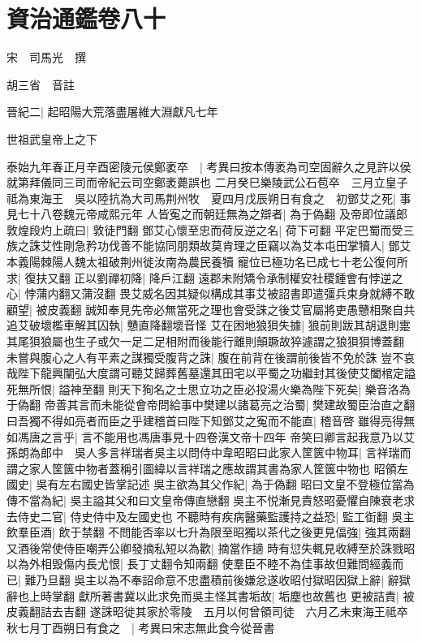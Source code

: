 \chapter{資治通鑑卷八十}
宋　司馬光　撰

胡三省　音註

晉紀二|{
	起昭陽大荒落盡屠維大淵獻凡七年}


世祖武皇帝上之下

泰始九年春正月辛酉密陵元侯鄭袤卒　|{
	考異曰按本傳袤為司空固辭久之見許以侯就第拜儀同三司而帝紀云司空鄭袤薨誤也}
二月癸巳樂陵武公石苞卒　三月立皇子祗為東海王　吳以陸抗為大司馬荆州牧　夏四月戊辰朔日有食之　初鄧艾之死|{
	事見七十八卷魏元帝咸熙元年}
人皆寃之而朝廷無為之辯者|{
	為于偽翻}
及帝即位議郎敦煌段灼上疏曰|{
	敦徒門翻}
鄧艾心懷至忠而荷反逆之名|{
	荷下可翻}
平定巴蜀而受三族之誅艾性剛急矜功伐善不能協同朋類故莫肯理之臣竊以為艾本屯田掌犢人|{
	鄧艾本義陽棘陽人魏太祖破荆州徙汝南為農民養犢}
寵位已極功名已成七十老公復何所求|{
	復扶又翻}
正以劉禪初降|{
	降戶江翻}
遠郡未附矯令承制權安社稷鍾會有悖逆之心|{
	悖蒲内翻又蒲沒翻}
畏艾威名因其疑似構成其事艾被詔書即遣彊兵束身就縛不敢顧望|{
	被皮義翻}
誠知奉見先帝必無當死之理也會受誅之後艾官屬將吏愚戇相聚自共追艾破壞檻車解其囚執|{
	戇直降翻壞音怪}
艾在困地狼狽失據|{
	狼前則跋其胡退則疐其尾狽狼屬也生子或欠一足二足相附而後能行離則顛蹶故猝遽謂之狼狽狽博蓋翻}
未嘗與腹心之人有平素之謀獨受腹背之誅|{
	腹在前背在後謂前後皆不免於誅}
豈不哀哉陛下龍興闡弘大度謂可聽艾歸葬舊墓還其田宅以平蜀之功繼封其後使艾闔棺定謚死無所恨|{
	謚神至翻}
則天下狥名之士思立功之臣必投湯火樂為陛下死矣|{
	樂音洛為于偽翻}
帝善其言而未能從會帝問給事中樊建以諸葛亮之治蜀|{
	樊建故蜀臣治直之翻}
曰吾獨不得如亮者而臣之乎建稽首曰陛下知鄧艾之寃而不能直|{
	稽音啓}
雖得亮得無如馮唐之言乎|{
	言不能用也馮唐事見十四卷漢文帝十四年}
帝笑曰卿言起我意乃以艾孫朗為郎中　吳人多言祥瑞者吳主以問侍中韋昭昭曰此家人筐篋中物耳|{
	言祥瑞而謂之家人筐篋中物者蓋稱引圖緯以言祥瑞之應故謂其書為家人筐篋中物也}
昭領左國史|{
	吳有左右國史皆掌記述}
吳主欲為其父作紀|{
	為于偽翻}
昭曰文皇不登極位當為傳不當為紀|{
	吳主謚其父和曰文皇帝傳直戀翻}
吳主不悦漸見責怒昭憂懼自陳衰老求去侍史二官|{
	侍史侍中及左國史也}
不聽時有疾病醫藥監護持之益恐|{
	監工衘翻}
吳主飲羣臣酒|{
	飲于禁翻}
不問能否率以七升為限至昭獨以茶代之後更見偪強|{
	強其兩翻}
又酒後常使侍臣嘲弄公卿發摘私短以為歡|{
	摘當作擿}
時有愆失輒見收縛至於誅戮昭以為外相毁傷内長尤恨|{
	長丁丈翻令知兩翻}
使羣臣不睦不為佳事故但難問經義而已|{
	難乃旦翻}
吳主以為不奉詔命意不忠盡積前後嫌忿遂收昭付獄昭因獄上辭|{
	辭獄辭也上時掌翻}
獻所著書冀以此求免而吳主怪其書垢故|{
	垢塵也故舊也}
更被詰責|{
	被皮義翻詰去吉翻}
遂誅昭徙其家於零陵　五月以何曾領司徒　六月乙未東海王祗卒　秋七月丁酉朔日有食之　|{
	考異曰宋志無此食今從晉書}

